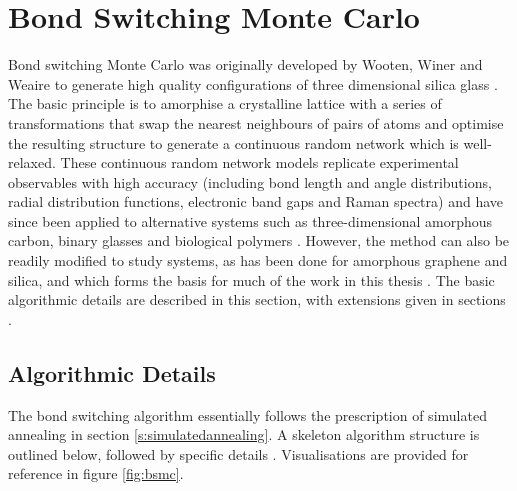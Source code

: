 \section{Bond Switching Monte Carlo}
\label{s:bondswitch}

Bond switching Monte Carlo was originally developed by Wooten, Winer and Weaire to generate high quality configurations of three dimensional silica glass \cite{Wooten1985}.
The basic principle is to amorphise a crystalline lattice with a series of transformations that swap the nearest neighbours of pairs of atoms and optimise the resulting structure to generate a continuous random network which is well\--relaxed.
These continuous random network models replicate experimental observables with high accuracy (including bond length and angle distributions, radial distribution functions, electronic band gaps and Raman spectra) and have since been applied to alternative systems such as three\--dimensional amorphous carbon, binary glasses and biological polymers \cite{Treacy2012,Tu1998,Djordjevic1995,Mousseau2004,Huisman2008,Broedersz2014}.
However, the method can also be readily modified to study \td{} systems, as has been done for amorphous graphene and silica, and which forms the basis for much of the work in this thesis  \cite{Kumar2014,Jain2018}.
The basic algorithmic details are described in this section, with extensions given in sections .

\subsection{Algorithmic Details} 

The \td{} bond switching algorithm essentially follows the prescription of simulated annealing in section \ref{s:simulatedannealing}.
A skeleton algorithm structure is outlined below, followed by specific details \cite{Kumar2012}.
Visualisations are provided for reference in figure \ref{fig:bsmc}.

